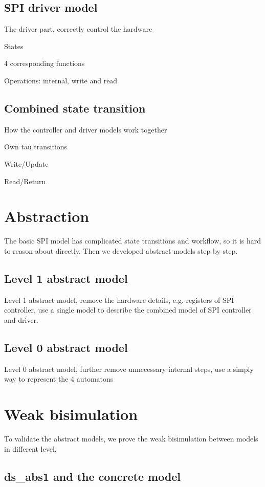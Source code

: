 \documentclass[runningheads]{llncs}
\begin{document}
\subsection{SPI driver model}
The driver part, correctly control the hardware

States

4 corresponding functions

Operations: internal, write and read


\subsection{Combined state transition}
How the controller and driver models work together

Own tau transitions

Write/Update

Read/Return

\section{Abstraction}
The basic SPI model has complicated state transitions and workflow, so it is hard to reason about directly. Then we developed abstract models step by step.

\subsection{Level 1 abstract model}
Level 1 abstract model, remove the hardware details, e.g. registers of SPI controller, use a single model to describe the combined model of SPI controller and driver.

\subsection{Level 0 abstract model}
Level 0 abstract model, further remove unnecessary internal steps, use a simply way to represent the 4 automatons

\section{Weak bisimulation}
To validate the abstract models, we prove the weak bisimulation between models in different level.

\subsection{ds\_abs1 and the concrete model}
\end{document}
